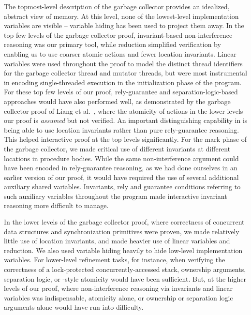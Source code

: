 The topmost-level description of the garbage collector provides an
idealized, abstract view of memory. 
At this level, none of the lowest-level implementation variables are
visible -- variable hiding has been used to project them away. 
In the top few levels of the garbage collector proof, invariant-based
non-interference reasoning was our primary tool, while reduction
simplified verification by enabling us to use coarser atomic actions and fewer
location invariants.  
Linear variables were used throughout the proof to model the distinct
thread identifiers for the garbage collector thread and mutator
threads, but were most instrumental in encoding single-threaded
execution in the initialization phase of the program. 
For these top few levels of our proof, rely-guarantee and separation-logic-based
approaches would have also performed well, as demonstrated by the
garbage collector proof of Liang et al.~\cite{LiangRGSim}, where
the atomicity of actions in the lower levels our proof is {\em
  assumed} but not verified.
An important distinguishing capability in \civl is being able to use location invariants rather than pure rely-guarantee reasoning.
This helped interactive proof at the top levels significantly.
For the mark phase of the garbage collector, we made critical use of
different invariants at different locations in procedure bodies. 
While the same non-interference argument could have been encoded in
rely-guarantee reasoning, as we had done ourselves in an earlier
version of our proof, 
it would have required the use of several additional auxiliary shared variables. 
Invariants, rely and guarantee conditions referring to such auxiliary
variables throughout the program made interactive invariant reasoning more difficult to manage. 

In the lower levels of the garbage collector proof, where
correctness of concurrent data structures and synchronization primitives were proven, we made
relatively little use of location invariants, and made heavier use of
linear variables and reduction. 
We also used variable hiding heavily to hide low-level implementation
variables. 
For lower-level refinement tasks, for instance, when verifying the correctness of a
lock-protected concurrently-accessed stack, ownership
arguments, separation logic, or \QED-style atomicity would have been
sufficient. 
But, at the higher levels of our proof, where non-interference
reasoning via invariants and linear variables was indispensable, 
atomicity alone, or ownership or separation logic arguments alone
would have run into difficulty. 

